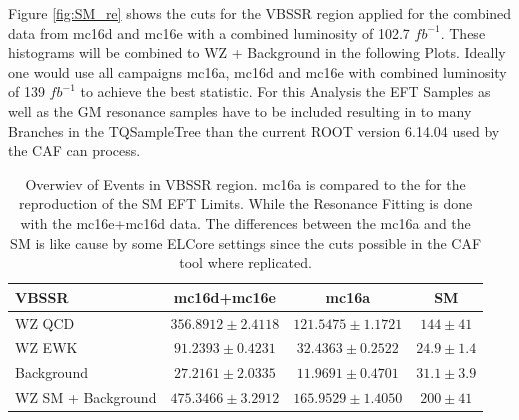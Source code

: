 \documentclass[../Bachelorarbeit.tex]{subfiles}
\begin{document}
Figure \ref*{fig:SM_re} shows the cuts for the VBSSR region applied for the combined data from mc16d and mc16e with a combined luminosity of 102.7 $fb^{-1}$.
These histograms will be combined to WZ + Background in the following Plots.
Ideally one would use all campaigns mc16a, mc16d and mc16e with combined luminosity of 139 $fb^{-1}$ to achieve the best statistic.
For this Analysis the EFT Samples as well as the GM resonance samples have to be included resulting in to many Branches in the TQSampleTree than
the current ROOT version 6.14.04 used by the CAF can process. 


\begin{table}
    \centering
    \begin{tabular}{ l c c c }
        \hline
        VBSSR & mc16d+mc16e & mc16a & SM\\
        \hline
        WZ QCD & $356.8912 \pm 2.4118$ & $121.5475 \pm 1.1721$ & $144 \pm 41$\\
        WZ EWK & $91.2393 \pm 0.4231$ & $32.4363 \pm 0.2522$ & $24.9 \pm 1.4$\\
        Background  & $27.2161 \pm 2.0335$ & $11.9691 \pm 0.4701$ &  $31.1 \pm 3.9$\\
        \hline 
        WZ SM + Background & $475.3466 \pm 3.2912$ & $165.9529 \pm 1.4050$ & $200 \pm 41$\\
        \hline
    \end{tabular}
    \caption{Overwiev of Events in VBSSR region. mc16a is compared to the \cite{STDM} for the reproduction of the SM EFT Limits.
        While the Resonance Fitting is done with the mc16e+mc16d data. The differences between the mc16a and the SM is like cause by some ELCore settings
        since the cuts possible in the CAF tool where replicated.}
    \label{tab:SM_re}
\end{table}
\end{document}
